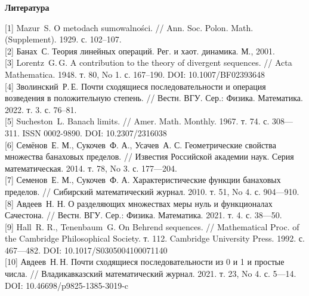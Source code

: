 \documentclass[14pt, a4paper]{extbook}
\begin{document}
\begin{center}
{\small \bf Литература}
\end{center}
\small
	{[1]}
	{Mazur~S.} O metodach sumowalności. // Ann. Soc. Polon. Math.
	(Supple\-ment). 1929. с. 102--107.
	\\
	{[2]}
	{Банах~С.} Теория линейных операций. Рег. и хаот.
	динамика. М., 2001.
	\\
	{[3]}
	{Lorentz~G.\,G.} A contribution to the theory of divergent sequences.
	// Acta Mathematica. 1948. т. 80, No 1. с. 167--190.
	DOI: 10.1007/BF02393648
	\\
	{[4]}
	Зволинский~Р.\,Е. Почти сходящиеся последовательности и операция
	возведения в положительную степень. // Вестн. ВГУ. Сер.: Физика.
	Математика. 2022. т. 3. с. 76--81.
	\\
	{[5]}
	{Sucheston~L.} Banach limits. // Amer. Math. Monthly. 1967.
	т. 74. с. 308—311. ISSN 0002-9890. DOI: 10.2307/2316038
	\\
	{[6]}
	{Семёнов~Е. М.}, {Сукочев~Ф. А.},
	{Усачев~А. С.} Геометрические свойства множества банаховых
	пределов. // Известия Российской академии наук. Серия математическая.
	2014. т. 78, No 3. с. 177—204.
	\\
	{[7]}
	{Семенов~Е. М.}, {Сукочев~Ф. А.}
	Характеристические функции банаховых пределов. // Сибирский математический
	журнал. 2010. т. 51, No 4. с. 904—910.
	\\
	{[8]}
	{Авдеев~Н. Н.} О разделяющих множествах меры нуль и
	функционалах Сачестона. // Вестн. ВГУ. Сер.: Физика. Математика. 2021.
	т. 4. с. 38—50.
	\\
	{[9]}
	{Hall~R. R.}, {Tenenbaum~G.} On Behrend sequences.
	// Mathematical Proc. of the Cambridge Philosophical Society. т. 112.
	Cambridge University Press. 1992. с. 467—482. DOI: 10.1017/S0305004100071140
	\\
	{[10]}
	Авдеев~Н.\,Н. Почти сходящиеся последовательности из 0 и 1 и
	простые числа. // Владикавказский математический журнал. 2021. т. 23,
	No 4. с. 5—14. DOI: 10.46698/p9825-1385-3019-c
\end{document}
